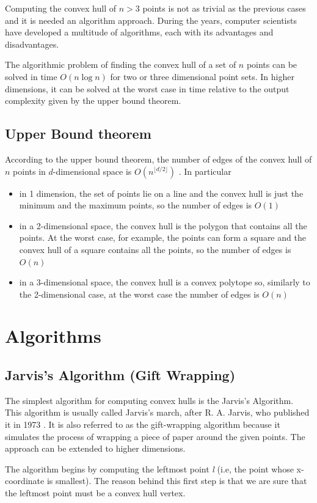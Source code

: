 \documentclass{article}
\begin{document}
Computing the convex hull of $n > 3$ points is not as trivial as the previous cases and it is needed an algorithm approach. During the years, computer scientists have developed a multitude of algorithms, each with its advantages and disadvantages.

The algorithmic problem of finding the convex hull of a set of $n$ points can be solved in time $O(n\log n)$ for two or three dimensional point sets. In higher dimensions, it can be solved at the worst case in time relative to the output complexity given by the upper bound theorem.

\subsection{Upper Bound theorem}
According to the upper bound theorem, the number of edges of the convex hull of $n$ points in $d$-dimensional space is $O(n^{\lfloor d/2 \rfloor})$ \cite{computgeombook}. In particular 
\begin{itemize}
  \item in 1 dimension, the set of points lie on a line and the convex hull is just the minimum and the maximum points, so the number of edges is $O(1)$
  \item in a 2-dimensional space, the convex hull is the polygon that contains all the points. At the worst case, for example, the points can form a square and the convex hull of a square contains all the points, so the number of edges is $O(n)$
  \item in a 3-dimensional space, the convex hull is a convex polytope so, similarly to the 2-dimensional case, at the worst case the number of edges is $O(n)$
\end{itemize}

\newpage
\section{Algorithms}
\subsection{Jarvis’s Algorithm (Gift Wrapping)}

The simplest algorithm for computing convex hulls is the Jarvis's Algorithm. This algorithm is usually called Jarvis’s march, after R. A. Jarvis, who published it in 1973 \cite{jarvis}. It is also referred to as the gift-wrapping algorithm because it simulates the process of wrapping a piece of paper around the given points. The approach can be extended to higher dimensions. \par
The algorithm begins by computing the leftmost point \textit{l} (i.e, the point whose x-coordinate is smallest). The reason behind this first step is that we are sure that the leftmost point must be a convex hull vertex.
\end{document}
